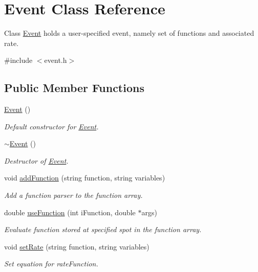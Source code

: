 \hypertarget{class_event}{}\section{Event Class Reference}
\label{class_event}


Class \hyperlink{class_event}{Event} holds a user-\/specified event, namely set of functions and associated rate.  




{\ttfamily \#include $<$event.\+h$>$}

\subsection*{Public Member Functions}
\begin{DoxyCompactItemize}
\item 
\hyperlink{class_event_a5a40dd4708297f7031e29b39e039ae10}{Event} ()
\begin{DoxyCompactList}\small\item\em Default constructor for \hyperlink{class_event}{Event}. \end{DoxyCompactList}\item 
\hyperlink{class_event_a7704ec01ce91e673885792054214b3d2}{$\sim$\+Event} ()
\begin{DoxyCompactList}\small\item\em Destructor of \hyperlink{class_event}{Event}. \end{DoxyCompactList}\item 
void \hyperlink{class_event_ad380e41418d2e34b651e052711fefe83}{add\+Function} (string function, string variables)
\begin{DoxyCompactList}\small\item\em Add a function parser to the function array. \end{DoxyCompactList}\item 
double \hyperlink{class_event_a2637844b7f9583caf0f808c898dc2246}{use\+Function} (int i\+Function, double $\ast$args)
\begin{DoxyCompactList}\small\item\em Evaluate function stored at specified spot in the function array. \end{DoxyCompactList}\item 
void \hyperlink{class_event_a993a01984496bc158be92b67422f8655}{set\+Rate} (string function, string variables)
\begin{DoxyCompactList}\small\item\em Set equation for rate\+Function. \end{DoxyCompactList}\item 

\end{DoxyCompactItemize}

